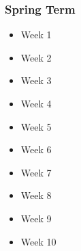 	\subsubsection{Spring Term}
	\begin{itemize}
		\item{Week 1}
		\item{Week 2}
		\item{Week 3}
		\item{Week 4}
		\item{Week 5}
		\item{Week 6}
		\item{Week 7}
		\item{Week 8}
		\item{Week 9}
		\item{Week 10}
	\end{itemize}

	\pagebreak
